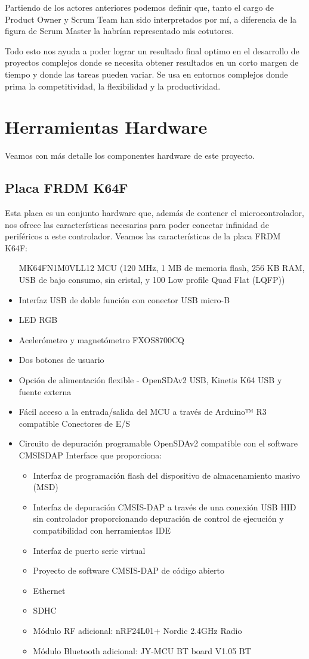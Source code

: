 Partiendo de los actores anteriores podemos definir que, tanto el cargo de Product Owner y Scrum Team han sido interpretados por mí, a diferencia de la figura de Scrum Master la habrían representado mis cotutores.

Todo esto nos ayuda a poder lograr un resultado final optimo en el desarrollo de proyectos complejos donde se necesita obtener resultados en un corto margen de tiempo y donde las tareas pueden variar. Se usa en entornos complejos donde prima la competitividad, la flexibilidad y la productividad.


\section{Herramientas Hardware}\label{sec:HHardware}

Veamos con más detalle los componentes hardware de este proyecto.

\subsection{Placa FRDM K64F}
Esta placa es un conjunto hardware que, además de contener el microcontrolador, nos ofrece las características necesarias para poder conectar infinidad de periféricos a este controlador.
Veamos las características de la placa FRDM K64F:
\begin{itemize}
\item[MK64FN1M0VLL12 MCU] (120 MHz, 1 MB de memoria flash, 256 KB RAM, USB de bajo consumo, sin cristal, y 100 Low profile Quad Flat (LQFP))
\item Interfaz USB de doble función con conector USB micro-B
\item LED RGB
\item Acelerómetro y magnetómetro FXOS8700CQ
\item Dos botones de usuario
\item Opción de alimentación flexible - OpenSDAv2 USB, Kinetis K64 USB y fuente externa
\item Fácil acceso a la entrada/salida del MCU a través de Arduino™ R3 compatible Conectores de E/S
\item Circuito de depuración programable OpenSDAv2 compatible con el software CMSISDAP Interface que proporciona:
\begin{itemize}
\item Interfaz de programación flash del dispositivo de almacenamiento masivo (MSD)
\item Interfaz de depuración CMSIS-DAP a través de una conexión USB HID sin controlador proporcionando depuración de control de ejecución y compatibilidad con herramientas IDE
\item Interfaz de puerto serie virtual
\item Proyecto de software CMSIS-DAP de código abierto
\item Ethernet
\item SDHC
\item Módulo RF adicional: nRF24L01+ Nordic 2.4GHz Radio
\item Módulo Bluetooth adicional: JY-MCU BT board V1.05 BT
\end{itemize}
\end{itemize}
 

